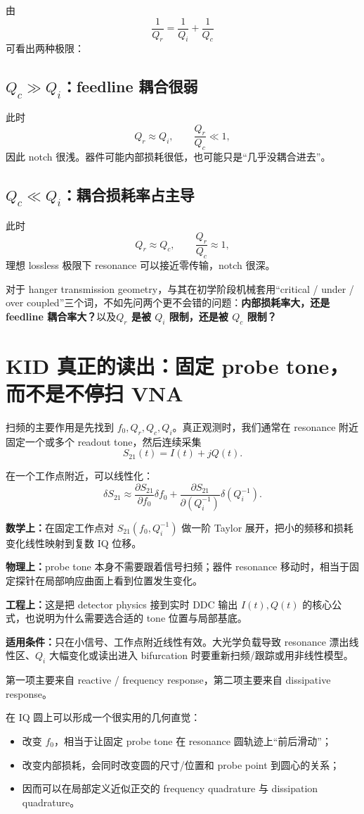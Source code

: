 \documentclass[11pt,a4paper,openany]{ctexrep}
\newcommand{\formulaexplain}[4]{%
\begin{formulaguidebox}
\textbf{\color{KidBlue}数学上：}#1\par
\textbf{\color{KidTeal}物理上：}#2\par
\textbf{\color{KidGold!55!black}工程上：}#3\par
\textbf{\color{KidRed}适用条件：}#4
\end{formulaguidebox}%
}
\begin{document}
由
\[
\frac1{Q_r}=\frac1{Q_i}+\frac1{Q_c}
\]
可看出两种极限：

\subsection{$Q_c\gg Q_i$：feedline 耦合很弱}
此时
\[
Q_r\approx Q_i,
\qquad
\frac{Q_r}{Q_c}\ll1,
\]
因此 notch 很浅。器件可能内部损耗很低，也可能只是“几乎没耦合进去”。

\subsection{$Q_c\ll Q_i$：耦合损耗率占主导}
此时
\[
Q_r\approx Q_c,
\qquad
\frac{Q_r}{Q_c}\approx1,
\]
理想 lossless 极限下 resonance 可以接近零传输，notch 很深。

\begin{intuitionbox}
对于 hanger transmission geometry，与其在初学阶段机械套用“critical / under / over coupled”三个词，不如先问两个更不会错的问题：\textbf{内部损耗率大，还是 feedline 耦合率大？}以及\textbf{$Q_r$ 是被 $Q_i$ 限制，还是被 $Q_c$ 限制？}
\end{intuitionbox}

\section{KID 真正的读出：固定 probe tone，而不是不停扫 VNA}

扫频的主要作用是先找到 $f_0,Q_r,Q_c,Q_i$。真正观测时，我们通常在 resonance 附近固定一个或多个 readout tone，然后连续采集
\[
S_{21}(t)=I(t)+jQ(t).
\]

在一个工作点附近，可以线性化：
\[
\boxed{
\delta S_{21}
\approx
\frac{\partial S_{21}}{\partial f_0}\delta f_0
+
\frac{\partial S_{21}}{\partial(Q_i^{-1})}\delta(Q_i^{-1}).
}
\]
\formulaexplain
{在固定工作点对 $S_{21}(f_0,Q_i^{-1})$ 做一阶 Taylor 展开，把小的频移和损耗变化线性映射到复数 IQ 位移。}
{probe tone 本身不需要跟着信号扫频；器件 resonance 移动时，相当于固定探针在局部响应曲面上看到位置发生变化。}
{这是把 detector physics 接到实时 DDC 输出 $I(t),Q(t)$ 的核心公式，也说明为什么需要选合适的 tone 位置与局部基底。}
{只在小信号、工作点附近线性有效。大光学负载导致 resonance 漂出线性区、$Q_i$ 大幅变化或读出进入 bifurcation 时要重新扫频/跟踪或用非线性模型。}
第一项主要来自 reactive / frequency response，第二项主要来自 dissipative response。

在 IQ 圆上可以形成一个很实用的几何直觉：
\begin{itemize}
  \item 改变 $f_0$，相当于让固定 probe tone 在 resonance 圆轨迹上“前后滑动”；
  \item 改变内部损耗，会同时改变圆的尺寸/位置和 probe point 到圆心的关系；
  \item 因而可以在局部定义近似正交的 frequency quadrature 与 dissipation quadrature。
\end{itemize}
\end{document}
